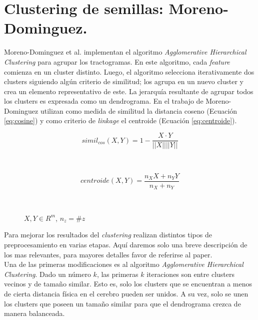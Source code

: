 \section{Clustering de semillas: Moreno-Dominguez.}

Moreno-Dominguez et al. \cite{Moreno-Dominguez2014} implementan el algoritmo
\textit{Agglomerative Hierarchical Clustering} para agrupar los tractogramas. 
En este algoritmo, cada \textit{feature} comienza en un cluster distinto. Luego,
el algoritmo selecciona iterativamente dos clusters siguiendo alg\'un criterio
de similitud; los agrupa en un nuevo cluster y crea un elemento representativo
de este. La jerarqu\'ia resultante de agrupar todos los clusters es expresada
como un dendrograma. En el trabajo de Moreno-Dominguez utilizan como medida de
similitud la distancia coseno (Ecuaci\'on \ref{eq:cosine}) y como criterio de
\textit{linkage} el centroide (Ecuaci\'on \ref{eq:centroide}).

\begin{figure}[h!]
                                                                                                                        
\begin{minipage}[b]{0.49\textwidth}
    \begin{equation}
        \label{eq:cosine}
        simil_{cos}(X,Y) = 1 - \frac{ X \cdot Y }{||X|| ||Y||}
    \end{equation}
\end{minipage} ~
\hfill
\begin{minipage}[b]{0.49\textwidth}
    \begin{equation}
        \label{eq:centroide}
        centroide(X,Y) = \frac{ n_X X + n_Y Y}{n_X + n_Y}
    \end{equation}
\end{minipage} ~

\centering
\vspace{0.5cm}
\small{$X, Y \in R^m$, $n_z = \#z$}

\end{figure}  

Para mejorar los resultados del \textit{clustering} realizan distintos tipos de
preprocesamiento en varias etapas. Aqu\'i daremos solo una breve descripci\'on 
de los mas relevantes, para mayores detalles favor de referirse al paper. \\

Una de las primeras modificaciones es al algoritmo 
\textit{Agglomerative Hierarchical Clustering}. Dado un n\'umero $k$,
las primeras $k$ iteraciones son entre clusters vecinos y de tama\~no similar.
Esto es, solo los clusters que se encuentran a menos de cierta distancia f\'isica
en el cerebro pueden ser unidos. A su vez, solo se unen los clusters que poseen
un tama\~no similar para que el dendrograma crezca de manera balanceada. \\


